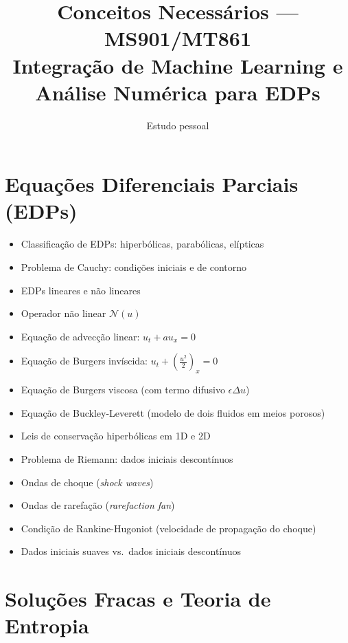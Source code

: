 \documentclass[12pt, a4paper]{article}
\title{\textbf{Conceitos Necessários --- MS901/MT861}\\
\large Integração de Machine Learning e Análise Numérica para EDPs}
\author{Estudo pessoal}
\date{}
\begin{document}
\maketitle

\section*{Equações Diferenciais Parciais (EDPs)}

\begin{itemize}
    \item Classificação de EDPs: hiperbólicas, parabólicas, elípticas
    \item Problema de Cauchy: condições iniciais e de contorno
    \item EDPs lineares e não lineares
    \item Operador não linear $\mathcal{N}(u)$
    \item Equação de advecção linear: $u_t + a u_x = 0$
    \item Equação de Burgers invíscida: $u_t + \left(\frac{u^2}{2}\right)_x = 0$
    \item Equação de Burgers viscosa (com termo difusivo $\epsilon \Delta u$)
    \item Equação de Buckley-Leverett (modelo de dois fluidos em meios porosos)
    \item Leis de conservação hiperbólicas em 1D e 2D
    \item Problema de Riemann: dados iniciais descontínuos
    \item Ondas de choque (\textit{shock waves})
    \item Ondas de rarefação (\textit{rarefaction fan})
    \item Condição de Rankine-Hugoniot (velocidade de propagação do choque)
    \item Dados iniciais suaves vs.\ dados iniciais descontínuos
\end{itemize}

\section*{Soluções Fracas e Teoria de Entropia}
\end{document}
